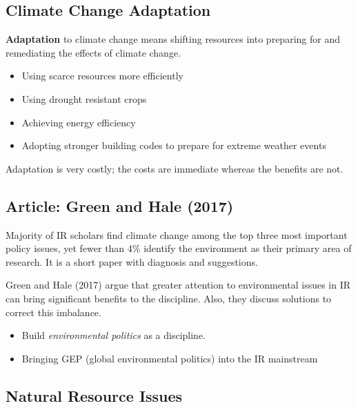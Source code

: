 \documentclass[
]{book}
\begin{document}
\hypertarget{climate-change-adaptation}{%
\subsection{Climate Change Adaptation}\label{climate-change-adaptation}}

\textbf{Adaptation} to climate change means shifting resources into preparing for and remediating the effects of climate change.

\begin{itemize}
\item
  Using scarce resources more efficiently
\item
  Using drought resistant crops
\item
  Achieving energy efficiency
\item
  Adopting stronger building codes to prepare for extreme weather events
\end{itemize}

Adaptation is very costly; the costs are immediate whereas the benefits are not.

\hypertarget{article-green-and-hale-2017}{%
\subsection{Article: Green and Hale (2017)}\label{article-green-and-hale-2017}}

Majority of IR scholars find climate change among the top three most important policy issues, yet fewer than 4\% identify the environment as their primary area of research. It is a short paper with diagnosis and suggestions.

Green and Hale (2017) argue that greater attention to environmental issues in IR can bring significant benefits to the discipline. Also, they discuss solutions to correct this imbalance.

\begin{itemize}
\item
  Build \emph{environmental politics} as a discipline.
\item
  Bringing GEP (global environmental politics) into the IR mainstream
\end{itemize}

\hypertarget{natural-resource-issues}{%
\subsection{Natural Resource Issues}\label{natural-resource-issues}}
\end{document}
